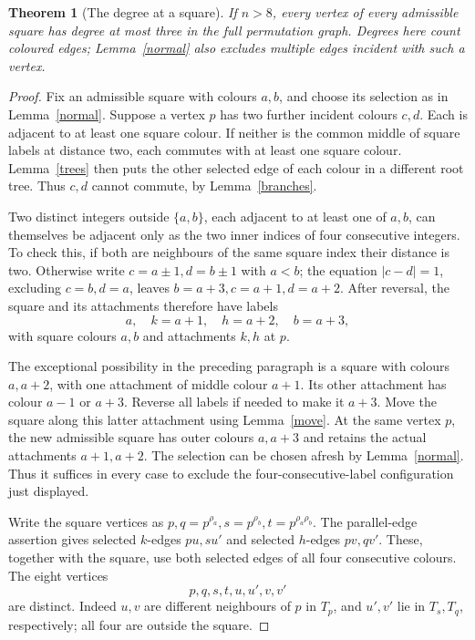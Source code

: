 \documentclass[11pt,a4paper]{article}
\newtheorem{theorem}{Theorem}
\begin{document}
\begin{theorem}[The degree at a square]\label{degree}
If $n>8$, every vertex of every admissible square has degree at
most three in the full permutation graph. Degrees here count
coloured edges; Lemma~\ref{normal} also excludes multiple edges
incident with such a vertex.
\end{theorem}
\begin{proof}
Fix an admissible square with colours $a,b$, and choose its
selection as in Lemma~\ref{normal}. Suppose a vertex $p$ has
two further incident colours $c,d$. Each is adjacent to at
least one square colour. If neither is the common middle of
square labels at distance two, each commutes with at least one
square colour. Lemma~\ref{trees} then puts the other selected
edge of each colour in a different root tree. Thus $c,d$
cannot commute, by Lemma~\ref{branches}.

Two distinct integers outside $\{a,b\}$, each adjacent to
at least one of $a,b$, can themselves be adjacent only as the
two inner indices of four consecutive integers. To check this,
if both are neighbours of the same square index their distance
is two. Otherwise write $c=a\pm1,d=b\pm1$ with $a<b$;
the equation $|c-d|=1$, excluding $c=b,d=a$, leaves
$b=a+3,c=a+1,d=a+2$. After reversal, the square and its
attachments therefore have labels
\[
                   a,\quad k=a+1,\quad h=a+2,\quad b=a+3,
\]
with square colours $a,b$ and attachments $k,h$ at $p$.

The exceptional possibility in the preceding paragraph is a
square with colours $a,a+2$, with one attachment of middle
colour $a+1$. Its other attachment has colour $a-1$ or $a+3$.
Reverse all labels if needed to make it $a+3$. Move the square
along this latter attachment using Lemma~\ref{move}. At the
same vertex $p$, the new admissible square has outer colours
$a,a+3$ and retains the actual attachments $a+1,a+2$. The
selection can be chosen afresh by Lemma~\ref{normal}. Thus it
suffices in every case to exclude the four-consecutive-label
configuration just displayed.

Write the square vertices as
$p,q=p^{\rho_a},s=p^{\rho_b},t=p^{\rho_a\rho_b}$.
The parallel-edge assertion gives selected $k$-edges $pu,su'$
and selected $h$-edges $pv,qv'$. These, together with the
square, use both selected edges of all four consecutive colours.
The eight vertices
\[
                         p,q,s,t,u,u',v,v'
\]
are distinct. Indeed $u,v$ are different neighbours of $p$ in
$T_p$, and $u',v'$ lie in $T_s,T_q$, respectively; all four
are outside the square.


\end{proof}
\end{document}
